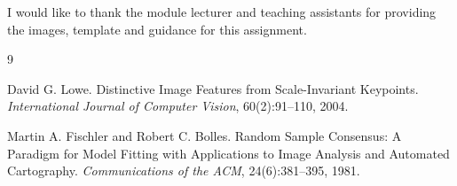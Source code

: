\documentclass{Resources/UoBLab1}
\begin{document}
I would like to thank the module lecturer and teaching assistants for providing the images, template and guidance for this assignment.

\begin{thebibliography}{9}

David G. Lowe.
Distinctive Image Features from Scale-Invariant Keypoints.
\emph{International Journal of Computer Vision}, 60(2):91--110, 2004.

Martin A. Fischler and Robert C. Bolles.
Random Sample Consensus: A Paradigm for Model Fitting with Applications to Image Analysis and Automated Cartography.
\emph{Communications of the ACM}, 24(6):381--395, 1981.

\end{thebibliography}
\end{document}
